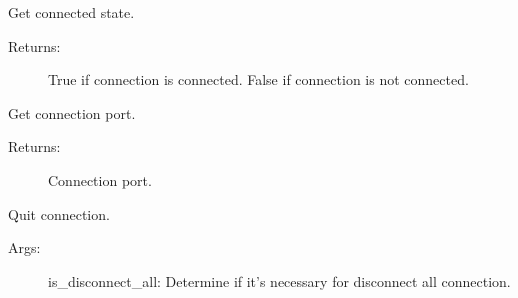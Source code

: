 \documentclass[letterpaper,10pt,english]{sphinxmanual}
\begin{document}
\begin{fulllineitems}
\begin{fulllineitems}
\begin{description}
\end{description}

\end{fulllineitems}


\begin{fulllineitems}
\label{\detokenize{QConnectBase:QConnectBase.tcp.tcp_base.TCPBase.is_connected}}
\sphinxAtStartPar
Get connected state.
\begin{description}
\item[{Returns:}] \leavevmode
\sphinxAtStartPar
True if connection is connected.
False if connection is not connected.

\end{description}

\end{fulllineitems}


\begin{fulllineitems}
\label{\detokenize{QConnectBase:QConnectBase.tcp.tcp_base.TCPBase.port}}
\sphinxAtStartPar
Get connection port.
\begin{description}
\item[{Returns:}] \leavevmode
\sphinxAtStartPar
Connection port.

\end{description}

\end{fulllineitems}


\begin{fulllineitems}
\label{\detokenize{QConnectBase:QConnectBase.tcp.tcp_base.TCPBase.quit}}
\sphinxAtStartPar
Quit connection.
\begin{description}
\item[{Args:}] \leavevmode
\sphinxAtStartPar
is\_disconnect\_all: Determine if it’s necessary for disconnect all connection.


\end{description}
\end{fulllineitems}
\end{fulllineitems}
\end{document}
